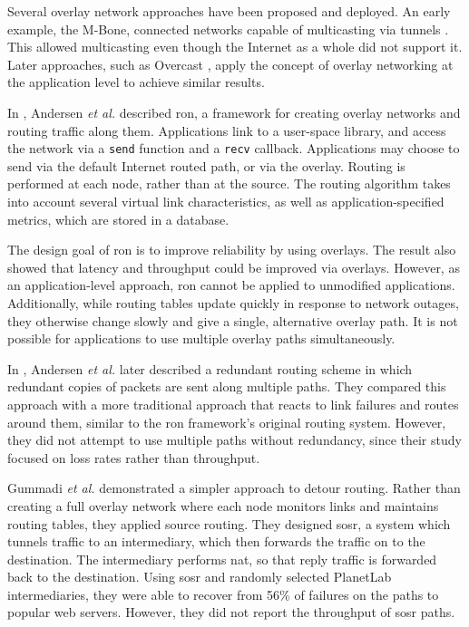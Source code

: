 \documentclass{cwru}
\begin{document}
Several overlay network approaches have been proposed and deployed. An early
example, the M-Bone, connected networks capable of multicasting via tunnels
\cite{mbone}. This allowed multicasting even though the Internet as a whole did
not support it. Later approaches, such as Overcast \cite{jannotti2000overcast},
apply the concept of overlay networking at the application level to achieve
similar results.

In \cite{ron}, Andersen \textit{et al.} described \ac{ron}, a framework for
creating overlay networks and routing traffic along them. Applications link to a
user-space library, and access the network via a \texttt{send} function and a
\texttt{recv} callback. Applications may choose to send via the default Internet
routed path, or via the overlay. Routing is performed at each node, rather than
at the source. The routing algorithm takes into account several virtual link
characteristics, as well as application-specified metrics, which are stored in a
database.

The design goal of \ac{ron} is to improve reliability by using overlays. The
result also showed that latency and throughput could be improved via overlays.
However, as an application-level approach, \ac{ron} cannot be applied to
unmodified applications. Additionally, while routing tables update quickly in
response to network outages, they otherwise change slowly and give a single,
alternative overlay path. It is not possible for applications to use multiple
overlay paths simultaneously.

In \cite{andersen2003best}, Andersen \textit{et al.} later described a redundant
routing scheme in which redundant copies of packets are sent along multiple
paths. They compared this approach with a more traditional approach that reacts
to link failures and routes around them, similar to the \ac{ron} framework's
original routing system. However, they did not attempt to use multiple paths
without redundancy, since their study focused on loss rates rather than
throughput.

Gummadi \textit{et al.} \cite{gummadi2004improving} demonstrated a simpler
approach to detour routing. Rather than creating a full overlay network where
each node monitors links and maintains routing tables, they applied source
routing. They designed \ac{sosr}, a system which tunnels traffic to an
intermediary, which then forwards the traffic on to the destination. The
intermediary performs \ac{nat}, so that reply traffic is forwarded back to the
destination. Using \ac{sosr} and randomly selected PlanetLab intermediaries,
they were able to recover from 56\% of failures on the paths to popular web
servers. However, they did not report the throughput of \ac{sosr} paths.
\end{document}
